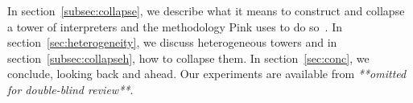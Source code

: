 \documentclass[sigplan,anonymous,review]{acmart}
\newcommand{\mslang}{$\lambda_{\uparrow\downarrow}$}
\newcommand{\mevl}{$M_{e}$}
\theoremstyle{definition}
\begin{document}
In
section~\ref{subsec:collapse}, we describe what it means to construct
and collapse a tower of interpreters and the methodology Pink
uses to do so~\cite{amin2017collapsing}. In
section~\ref{sec:heterogeneity}, we discuss heterogeneous towers
and in section~\ref{subsec:collapseh}, how to collapse them.
In section~\ref{sec:conc}, we conclude, looking back and ahead.
Our experiments are available from \textit{**omitted for double-blind review**}.

\begin{figure*}
    \centering
    \hspace*{1.5cm}
    \begin{subfigure}{0.3\linewidth}
\end{subfigure}
\end{figure*}
\end{document}
